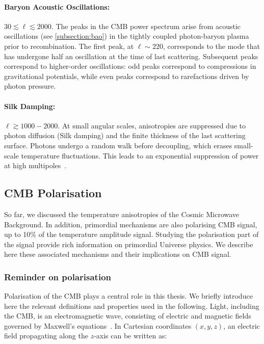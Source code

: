 \documentclass[../../thesis.tex]{subfiles}
\begin{document}
\paragraph{Baryon Acoustic Oscillations:} $30 \lesssim \ell \lesssim 2000.$ The peaks in the CMB power spectrum arise from acoustic oscillations (see \ref{subsection:bao}) in the tightly coupled photon-baryon plasma prior to recombination. The first peak, at $\ell \sim 220$, corresponds to the mode that has undergone half an oscillation at the time of last scattering. Subsequent peaks correspond to higher-order oscillations: odd peaks correspond to compressions in gravitational potentials, while even peaks correspond to rarefactions driven by photon pressure.

\paragraph{Silk Damping:} $\ell \gtrsim 1000-2000.$ At small angular scales, anisotropies are suppressed due to photon diffusion (Silk damping) and the finite thickness of the last scattering surface. Photons undergo a random walk before decoupling, which erases small-scale temperature fluctuations. This leads to an exponential suppression of power at high multipoles~\cite{Silk1968}. 

\subsection{CMB Polarisation}

So far, we discussed the temperature anisotropies of the Cosmic Microwave Background. In addition, primordial mechanisms are also polarising CMB signal, up to 10\% of the temperature amplitude signal. Studying the polarisation part of the signal provide rich information on primordial Universe physics. We describe here these associated mechanisms and their implications on CMB signal.

\subsubsection{Reminder on polarisation} \label{subsub:polarisation}

Polarisation of the CMB plays a central role in this thesis. We briefly introduce here the relevant definitions and properties used in the following. Light, including the CMB, is an electromagnetic wave, consisting of electric and magnetic fields governed by Maxwell's equations~\cite{Maxwell1865}. In Cartesian coordinates $(x, y, z)$, an electric field propagating along the $z$-axis can be written as:
\end{document}

